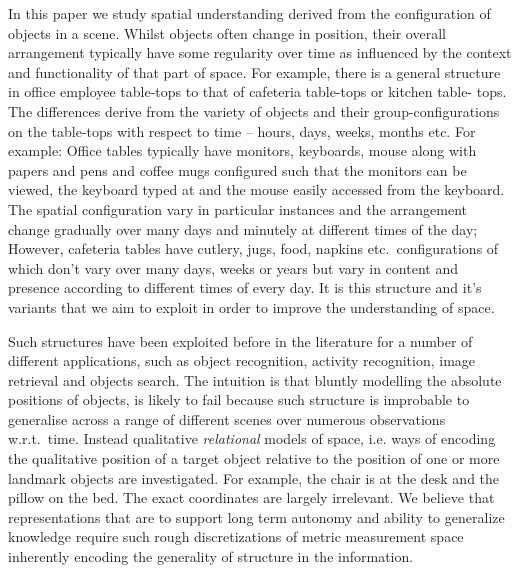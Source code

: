 \documentclass[letterpaper, 10 pt, conference]{ieeeconf}  %
\begin{document}
In this paper we study spatial understanding derived from the configuration of objects in a scene. Whilst objects often change in position, their overall arrangement typically have some regularity over time as influenced by the context and functionality of that part of space.
For example, there is a general structure in office employee table-tops to that of cafeteria table-tops or kitchen table-
tops. The differences derive from the variety of objects and their group-configurations on the table-tops with respect to time -- hours, 
days, weeks, months etc. For example: Office tables typically have monitors, keyboards, mouse along with papers and pens and coffee mugs 
configured such that the monitors can be viewed, the keyboard typed at and the mouse easily accessed from the keyboard. The spatial 
configuration vary in particular instances and the arrangement change gradually over many days and minutely at different times of the day; 
However, cafeteria tables have cutlery, jugs, food, napkins etc.\ configurations of which don't vary over many days, weeks or years but vary 
in content and presence according to different times of every day. It is this structure and it's variants that we aim to exploit in order to 
improve the understanding of space.

Such structures have been exploited before in the literature for a
number of different applications, such as object recognition, activity
recognition, image retrieval and objects search. The intuition is that
bluntly modelling the absolute positions of objects, is likely to fail
because such structure is improbable to generalise across a range of
different scenes over numerous observations w.r.t.\ time. Instead
qualitative \emph{relational} models of space, i.e. ways of encoding
the qualitative position of a target object relative to the position
of one or more landmark objects are investigated. For example, the
chair is at the desk and the pillow on the bed. The exact coordinates
are largely irrelevant. We believe that representations that are to
support long term autonomy and ability to generalize knowledge require
such rough discretizations of metric measurement space inherently
encoding the generality of structure in the information.
\end{document}
